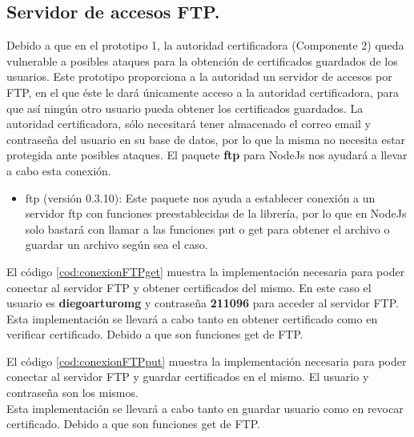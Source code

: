 \documentclass[12pt, a4paper, titlepage]{report}
\begin{document}
            \subsection{Servidor de accesos FTP.}
            Debido a que en el prototipo 1, la autoridad certificadora (Componente 2) queda vulnerable a posibles ataques para la obtención de certificados guardados de los usuarios. Este prototipo proporciona a la autoridad un servidor de accesos por FTP, en el que éste le dará únicamente acceso a la autoridad certificadora, para que así ningún otro usuario pueda obtener los certificados guardados. La autoridad certificadora, sólo necesitará tener almacenado el correo email y contraseña del usuario en su base de datos, por lo que la misma no necesita estar protegida ante posibles ataques.
            El paquete \textbf{ftp} para NodeJs nos ayudará a llevar a cabo esta conexión.
            
            \begin{itemize}
                \item ftp (versión 0.3.10): Este paquete nos ayuda a establecer conexión a un servidor ftp con funciones preestablecidas de la librería, por lo que en NodeJs solo bastará con llamar a las funciones put o get para obtener el archivo o guardar un archivo según sea el caso. 
            \end{itemize}
        
            El código \ref{cod:conexionFTPget} muestra la implementación necesaria para poder conectar al servidor FTP y obtener certificados del mismo. En este caso el usuario es \textbf{diegoarturomg} y contraseña \textbf{211096} para acceder al servidor FTP.\\
            
            Esta implementación se llevará a cabo tanto en obtener certificado como en verificar certificado. Debido a que son funciones get de FTP.
            
            
        
        
            El código \ref{cod:conexionFTPput} muestra la implementación necesaria para poder conectar al servidor FTP y guardar certificados en el mismo. El usuario y contraseña son los mismos.\\
            
            Esta implementación se llevará a cabo tanto en guardar usuario como en revocar certificado. Debido a que son funciones get de FTP.
            
            
            
\end{document}
